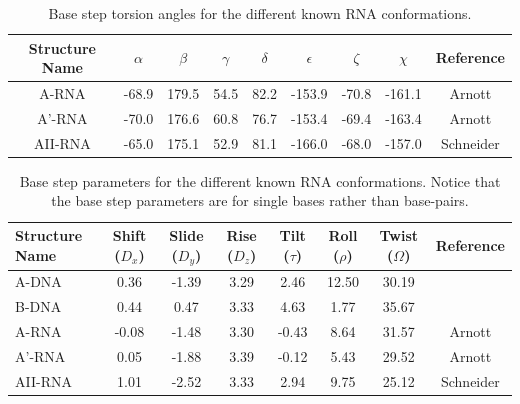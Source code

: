 \begin{table}[htbp]
\begin{center}
{\small
\begin{tabular}{c|c|c|c|c|c|c|c|c}
\hline
\bf{Structure Name} & $\alpha$ & $\beta$ & $\gamma$ & $\delta$ & $\epsilon$
& $\zeta$ & $\chi$ & \bf{Reference} \\ \hline
A-RNA & -68.9 & 179.5 & 54.5 & 82.2 & -153.9 & -70.8 & -161.1 & Arnott \\ \hline
A'-RNA & -70.0 & 176.6 & 60.8 & 76.7 & -153.4 & -69.4 & -163.4 & Arnott \\ \hline
AII-RNA & -65.0 & 175.1 & 52.9 & 81.1 & -166.0 & -68.0 & -157.0 & Schneider \\ \hline
\end{tabular}
}
\caption{Base step torsion angles for the different known RNA conformations.}
\label{tab:tor_conf}
\end{center}
\end{table}

\begin{table}[htbp]
\begin{center}
{\small
\begin{tabular}{p{2cm}|c|c|c|c|c|c|c}
\hline
\bf{Structure Name} & Shift ($D_x$) & Slide ($D_y$) & Rise ($D_z$) & Tilt
($\tau$) & Roll ($\rho$) & Twist ($\Omega$) & \bf{Reference} \\ \hline
A-DNA & 0.36 & -1.39 & 3.29 & 2.46 & 12.50 & 30.19 & \\ \hline
B-DNA & 0.44 & 0.47 & 3.33 & 4.63 & 1.77 & 35.67 & \\ \hline
A-RNA & -0.08 & -1.48 & 3.30 & -0.43 & 8.64 & 31.57 & Arnott \\ \hline
A'-RNA & 0.05 & -1.88 & 3.39 & -0.12 & 5.43 & 29.52 & Arnott \\ \hline
AII-RNA & 1.01 & -2.52 & 3.33 & 2.94 & 9.75 & 25.12 & Schneider \\ \hline
\end{tabular}
}
\caption{Base step parameters for the different known RNA
  conformations. Notice that the base step parameters are for single
  bases rather than base-pairs.}
\label{tab:step_conf}
\end{center}
\end{table}




